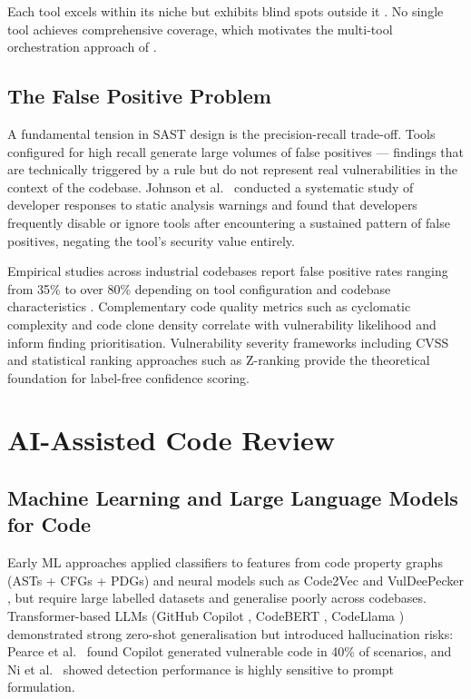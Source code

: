 Each tool excels within its niche but exhibits blind spots outside it \cite{bandit_tool,semgrep_tool,gosec_tool,eslint_security}. No single tool achieves comprehensive coverage, which motivates the multi-tool orchestration approach of \ACRQA{} \cite{ayewah2008using}.

\subsection{The False Positive Problem}

A fundamental tension in SAST design is the precision-recall trade-off. Tools configured for high recall generate large volumes of false positives --- findings that are technically triggered by a rule but do not represent real vulnerabilities in the context of the codebase. Johnson et al.\ \cite{johnson2013dont} conducted a systematic study of developer responses to static analysis warnings and found that developers frequently disable or ignore tools after encountering a sustained pattern of false positives, negating the tool's security value entirely.

Empirical studies across industrial codebases report false positive rates ranging from 35\% to over 80\% depending on tool configuration and codebase characteristics \cite{muske2016survey}. Complementary code quality metrics such as cyclomatic complexity \cite{mccabe1976complexity} and code clone density \cite{roy2009comparison} correlate with vulnerability likelihood and inform finding prioritisation. Vulnerability severity frameworks including CVSS \cite{cvss_v3} and statistical ranking approaches such as Z-ranking \cite{kremenek2003z} provide the theoretical foundation for label-free confidence scoring.

\section{AI-Assisted Code Review}
\label{sec:ai_code_review}

\subsection{Machine Learning and Large Language Models for Code}

Early ML approaches applied classifiers to features from code property graphs (ASTs + CFGs + PDGs) \cite{yamaguchi2014modeling} and neural models such as Code2Vec \cite{alon2019code2vec} and VulDeePecker \cite{li2018vuldeepecker}, but require large labelled datasets and generalise poorly across codebases. Transformer-based LLMs (GitHub Copilot \cite{chen2021evaluating}, CodeBERT \cite{feng2020codebert}, CodeLlama \cite{roziere2023code}) demonstrated strong zero-shot generalisation \cite{thapa2022transformer} but introduced hallucination risks: Pearce et al.\ \cite{pearce2022asleep} found Copilot generated vulnerable code in 40\% of scenarios, and Ni et al.\ \cite{ni2023chatgpt} showed detection performance is highly sensitive to prompt formulation.

